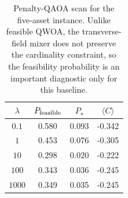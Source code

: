 \begin{table}[t]
\centering
\caption{Penalty-QAOA scan for the five-asset instance. Unlike feasible QWOA, the transverse-field mixer does not preserve the cardinality constraint, so the feasibility probability is an important diagnostic only for this baseline.}
\label{tab:penalty-scan}
\begin{tabular}{cccc}
\toprule
$\lambda$ & $P_{\rm feasible}$ & $P_\star$ & $\langle C\rangle$\\
\midrule
$0.1$ & 0.580 & 0.093 & -0.342\\
$1$ & 0.453 & 0.076 & -0.305\\
$10$ & 0.298 & 0.020 & -0.222\\
$100$ & 0.343 & 0.036 & -0.245\\
$1000$ & 0.349 & 0.035 & -0.245\\
\bottomrule
\end{tabular}
\end{table}
